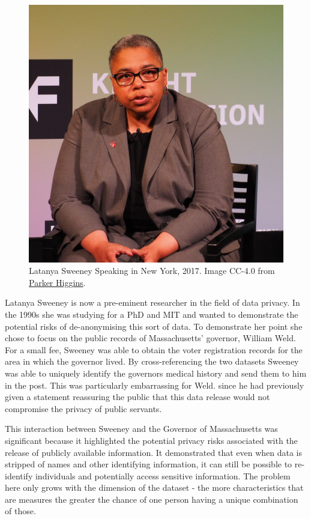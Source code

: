 \documentclass[
  12pt,
]{book}
\begin{document}
\begin{figure}
\centering
\includegraphics{images/501-ethics-privacy/latanya-sweeney.jpg}
\caption{Latanya Sweeney Speaking in New York, 2017. Image CC-4.0 from \href{https://en.wikipedia.org/wiki/User:ParkerHiggins}{Parker Higgins}.}
\end{figure}

Latanya Sweeney is now a pre-eminent researcher in the field of data privacy. In the 1990s she was studying for a PhD and MIT and wanted to demonstrate the potential risks of de-anonymising this sort of data. To demonstrate her point she chose to focus on the public records of Massachusetts' governor, William Weld. For a small fee, Sweeney was able to obtain the voter registration records for the area in which the governor lived. By cross-referencing the two datasets Sweeney was able to uniquely identify the governors medical history and send them to him in the post. This was particularly embarrassing for Weld. since he had previously given a statement reassuring the public that this data release would not compromise the privacy of public servants.

This interaction between Sweeney and the Governor of Massachusetts was significant because it highlighted the potential privacy risks associated with the release of publicly available information. It demonstrated that even when data is stripped of names and other identifying information, it can still be possible to re-identify individuals and potentially access sensitive information. The problem here only grows with the dimension of the dataset - the more characteristics that are measures the greater the chance of one person having a unique combination of those.
\end{document}
